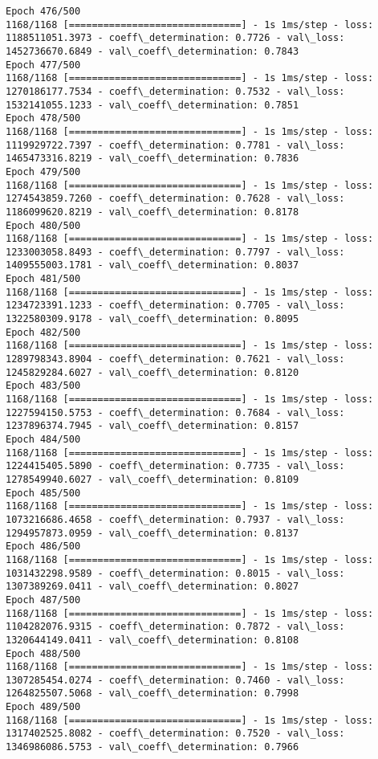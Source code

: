 \documentclass[11pt]{article}
\begin{document}
\begin{Verbatim}[commandchars=\\\{\}]
Epoch 476/500
1168/1168 [==============================] - 1s 1ms/step - loss: 1188511051.3973 - coeff\_determination: 0.7726 - val\_loss: 1452736670.6849 - val\_coeff\_determination: 0.7843
Epoch 477/500
1168/1168 [==============================] - 1s 1ms/step - loss: 1270186177.7534 - coeff\_determination: 0.7532 - val\_loss: 1532141055.1233 - val\_coeff\_determination: 0.7851
Epoch 478/500
1168/1168 [==============================] - 1s 1ms/step - loss: 1119929722.7397 - coeff\_determination: 0.7781 - val\_loss: 1465473316.8219 - val\_coeff\_determination: 0.7836
Epoch 479/500
1168/1168 [==============================] - 1s 1ms/step - loss: 1274543859.7260 - coeff\_determination: 0.7628 - val\_loss: 1186099620.8219 - val\_coeff\_determination: 0.8178
Epoch 480/500
1168/1168 [==============================] - 1s 1ms/step - loss: 1233003058.8493 - coeff\_determination: 0.7797 - val\_loss: 1409555003.1781 - val\_coeff\_determination: 0.8037
Epoch 481/500
1168/1168 [==============================] - 1s 1ms/step - loss: 1234723391.1233 - coeff\_determination: 0.7705 - val\_loss: 1322580309.9178 - val\_coeff\_determination: 0.8095
Epoch 482/500
1168/1168 [==============================] - 1s 1ms/step - loss: 1289798343.8904 - coeff\_determination: 0.7621 - val\_loss: 1245829284.6027 - val\_coeff\_determination: 0.8120
Epoch 483/500
1168/1168 [==============================] - 1s 1ms/step - loss: 1227594150.5753 - coeff\_determination: 0.7684 - val\_loss: 1237896374.7945 - val\_coeff\_determination: 0.8157
Epoch 484/500
1168/1168 [==============================] - 1s 1ms/step - loss: 1224415405.5890 - coeff\_determination: 0.7735 - val\_loss: 1278549940.6027 - val\_coeff\_determination: 0.8109
Epoch 485/500
1168/1168 [==============================] - 1s 1ms/step - loss: 1073216686.4658 - coeff\_determination: 0.7937 - val\_loss: 1294957873.0959 - val\_coeff\_determination: 0.8137
Epoch 486/500
1168/1168 [==============================] - 1s 1ms/step - loss: 1031432298.9589 - coeff\_determination: 0.8015 - val\_loss: 1307389269.0411 - val\_coeff\_determination: 0.8027
Epoch 487/500
1168/1168 [==============================] - 1s 1ms/step - loss: 1104282076.9315 - coeff\_determination: 0.7872 - val\_loss: 1320644149.0411 - val\_coeff\_determination: 0.8108
Epoch 488/500
1168/1168 [==============================] - 1s 1ms/step - loss: 1307285454.0274 - coeff\_determination: 0.7460 - val\_loss: 1264825507.5068 - val\_coeff\_determination: 0.7998
Epoch 489/500
1168/1168 [==============================] - 1s 1ms/step - loss: 1317402525.8082 - coeff\_determination: 0.7520 - val\_loss: 1346986086.5753 - val\_coeff\_determination: 0.7966

\end{Verbatim}
\end{document}
